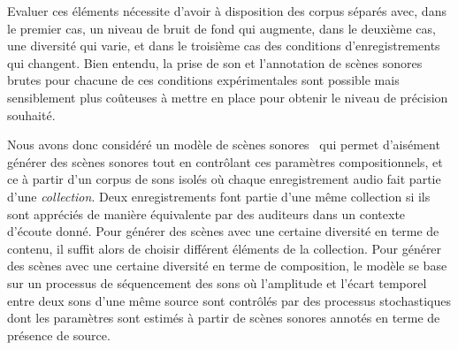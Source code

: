 Evaluer ces éléments nécessite d'avoir à disposition des corpus séparés avec, dans le premier cas, un niveau de bruit de fond qui augmente, dans le deuxième cas, une diversité qui varie, et dans le troisième cas des conditions d'enregistrements qui changent. Bien entendu, la prise de son et l'annotation de scènes sonores brutes pour chacune de ces conditions expérimentales sont possible mais sensiblement plus coûteuses à mettre en place pour obtenir le niveau de précision souhaité.


Nous avons donc considéré un modèle de scènes sonores~\cite{lafayPhd} qui permet d'aisément générer des scènes sonores tout en contrôlant ces paramètres compositionnels, et ce à partir d'un corpus de sons isolés où chaque enregistrement audio fait partie d'une \textit{collection}. Deux enregistrements font partie d'une même collection si ils sont appréciés de manière équivalente par des auditeurs dans un contexte d'écoute donné. Pour générer des scènes avec une certaine diversité en terme de contenu, il suffit alors de choisir différent éléments de la collection. Pour générer des scènes avec une certaine diversité en terme de composition, le modèle se base sur un processus de séquencement des sons où l'amplitude et l'écart temporel entre deux sons d'une même source sont contrôlés par des processus stochastiques dont les paramètres sont estimés à partir de scènes sonores annotés en terme de présence de source.



